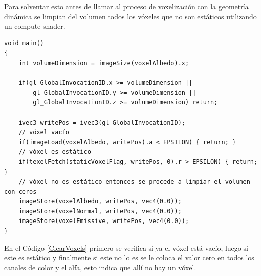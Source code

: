 Para solventar esto antes de llamar al proceso de voxelización con la geometría dinámica se limpian del volumen todos los vóxeles que no son estáticos utilizando un compute shader.
\\
\begin{lstlisting}[caption={Limpieza de vóxeles no estáticos.}, label=ClearVoxels]
void main()
{
    int volumeDimension = imageSize(voxelAlbedo).x;

    if(gl_GlobalInvocationID.x >= volumeDimension ||
        gl_GlobalInvocationID.y >= volumeDimension ||
        gl_GlobalInvocationID.z >= volumeDimension) return;

    ivec3 writePos = ivec3(gl_GlobalInvocationID);
    // vóxel vacío
    if(imageLoad(voxelAlbedo, writePos).a < EPSILON) { return; }
    // vóxel es estático
    if(texelFetch(staticVoxelFlag, writePos, 0).r > EPSILON) { return; }
    // vóxel no es estático entonces se procede a limpiar el volumen con ceros
    imageStore(voxelAlbedo, writePos, vec4(0.0));
    imageStore(voxelNormal, writePos, vec4(0.0));
    imageStore(voxelEmissive, writePos, vec4(0.0));
}
\end{lstlisting}

En el Código \ref{ClearVoxels} primero se verifica si ya el vóxel está vacío, luego si este es estático y finalmente si este no lo es se le coloca el valor cero en todos los canales de color y el alfa, esto indica que allí no hay un vóxel.
